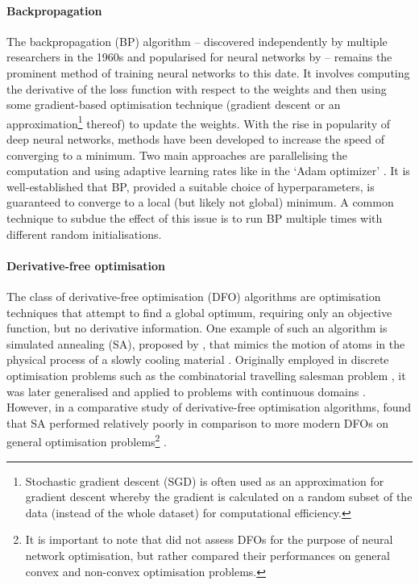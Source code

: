 \paragraph{Backpropagation}
The backpropagation (BP) algorithm -- discovered independently by multiple researchers in the 1960s and popularised for neural networks by \textcite{rumelhart1986} -- remains the prominent method of training neural networks to this date.
It involves computing the derivative of the loss function with respect to the weights and then using some gradient-based optimisation technique (gradient descent or an approximation\footnote{Stochastic gradient descent (SGD) is often used as an approximation for gradient descent whereby the gradient is calculated on a random subset of the data (instead of the whole dataset) for computational efficiency.} thereof) to update the weights.
With the rise in popularity of deep neural networks, methods have been developed to increase the speed of converging to a minimum. 
Two main approaches are parallelising the computation and using adaptive learning rates like in the `Adam optimizer' \cite{kingma2014}.
It is well-established that BP, provided a suitable choice of hyperparameters, is guaranteed to converge to a local (but likely not global) minimum.
A common technique to subdue the effect of this issue is to run BP multiple times with different random initialisations.

\paragraph{Derivative-free optimisation}
The class of derivative-free optimisation (DFO) algorithms are optimisation techniques that attempt to find a global optimum, requiring only an objective function, but no derivative information.
One example of such an algorithm is simulated annealing (SA), proposed by \citeauthor{kirkpatrick1983}, that mimics the motion of atoms in the physical process of a slowly cooling material \cite*{kirkpatrick1983}.
Originally employed in discrete optimisation problems such as the combinatorial travelling salesman problem \cite{cerny1985}, it was later generalised and applied to problems with continuous domains \cite{belisle1993}.
However, in a comparative study of derivative-free optimisation algorithms, \citeauthor{rios2009} found that SA performed relatively poorly in comparison to more modern DFOs on general optimisation problems\footnote{It is important to note that \citeauthor{rios2009} did not assess DFOs for the purpose of neural network optimisation, but rather compared their performances on general convex and non-convex optimisation problems.} \cite*{rios2009}.

